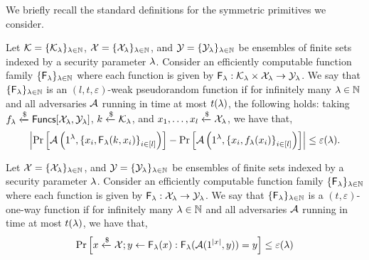 We briefly recall the standard definitions for the symmetric primitives we consider.

\begin{definition}
Let $\mathcal{K} = \{\mathcal{K}_\lambda\}_{\lambda \in \mathbb{N}}$, $\mathcal{X} = \{\mathcal{X}_\lambda\}_{\lambda \in \mathbb{N}}$, and $\mathcal{Y} = \{\mathcal{Y}_\lambda\}_{\lambda \in \mathbb{N}}$ be ensembles of finite sets indexed by a security parameter $\lambda$. Consider an efficiently computable function family $\{\mathsf{F}_\lambda\}_{\lambda \in \mathbb{N}}$ where each function is given by $\mathsf{F}_\lambda: \mathcal{K}_\lambda \times \mathcal{X}_\lambda \to \mathcal{Y}_\lambda$.
We say that $\{\mathsf{F}_\lambda\}_{\lambda \in \mathbb{N}}$ is an $(l, t, \varepsilon)$-weak pseudorandom function if for infinitely many $\lambda \in \mathbb{N}$ and all adversaries $\mathcal{A}$ running in time at most $t(\lambda)$, the following holds: taking $f_\lambda \xleftarrow{\$} \mathsf{Funcs}[\mathcal{X}_\lambda, \mathcal{Y}_\lambda]$, $k \xleftarrow{\$} \mathcal{K}_\lambda$, and $x_1, \dots, x_l \xleftarrow{\$} \mathcal{X}_\lambda$, we have that,
\[
    \left|\Pr\left[ \mathcal{A}\left(1^\lambda, {\{ x_i, \mathsf{F}_\lambda(k,x_i)\}}_{i \in [l]} \right)\right]
    - \Pr\left[ \mathcal{A}\left(1^\lambda, {\{ x_i, f_\lambda(x_i)\}}_{i \in [l]}\right)\right] \right| \leq \varepsilon(\lambda).
\]
\end{definition}


\begin{definition}
Let $\mathcal{X} = \{\mathcal{X}_\lambda\}_{\lambda \in \mathbb{N}}$, and $\mathcal{Y} = \{\mathcal{Y}_\lambda\}_{\lambda \in \mathbb{N}}$ be ensembles of finite sets indexed by a security parameter $\lambda$. Consider an efficiently computable function family $\{\mathsf{F}_\lambda\}_{\lambda \in \mathbb{N}}$ where each function is given by $\mathsf{F}_\lambda: \mathcal{X}_\lambda \to \mathcal{Y}_\lambda$.
We say that $\{\mathsf{F}_\lambda\}_{\lambda \in \mathbb{N}}$ is a $(t, \varepsilon)$-one-way function if for infinitely many $\lambda \in \mathbb{N}$ and all adversaries $\mathcal{A}$ running in time at most $t(\lambda)$, we have that,
\[
    \Pr\left[x \xleftarrow{\$} \mathcal{X}; y \gets \mathsf{F}_\lambda(x) : \mathsf{F}_\lambda(\mathcal{A}(1^{\left| {x} \right|}, y)) = y \right] \leq \varepsilon(\lambda)
\]
\end{definition}

